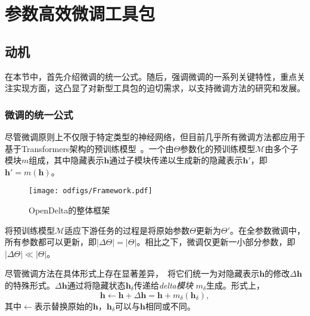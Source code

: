 
\section{参数高效微调工具包}

\subsection{动机}

在本节中，首先介绍微调的统一公式。随后，强调微调的一系列关键特性，重点关注实现方面，这凸显了对新型工具包的迫切需求，以支持微调方法的研究和发展。


\subsubsection{微调的统一公式}

尽管微调原则上不仅限于特定类型的神经网络，但目前几乎所有微调方法都应用于基于Transformers架构的预训练模型~\cite{devlin2018bert, liu2019roberta, raffel2019exploring, brown2020language}。一个由$\Theta$参数化的预训练模型$\mathcal{M}$由多个子模块$m$组成，其中隐藏表示$\mathbf{h}$通过子模块传递以生成新的隐藏表示$\mathbf{h}'$，即$\mathbf{h}' = m(\mathbf{h})$。

\begin{figure*}[!htbp]
    \centering
    \texttt{[image: odfigs/Framework.pdf]}
    \caption{OpenDelta的整体框架}
    \label{fig:framework}
\end{figure*}

将预训练模型$\mathcal{M}$适应下游任务的过程是将原始参数$\Theta$更新为$\Theta'$。在全参数微调中，所有参数都可以更新，即$|\Delta \Theta| = |\Theta|$。相比之下，微调仅更新一小部分参数，即$|\Delta \Theta| \ll |\Theta|$。

尽管微调方法在具体形式上存在显著差异，~\citet{he2022unified}将它们统一为对隐藏表示$\mathbf{h}$的修改$\Delta \mathbf{h}$的特殊形式。$\Delta \mathbf{h}$通过将隐藏状态$\mathbf{h}_{{\delta}}$传递给\textit{delta模块} $m_\delta$生成。形式上，
\begin{equation}
\label{equ:unifydelta}
\mathbf{h} \leftarrow \mathbf{h} + \Delta \mathbf{h} = \mathbf{h} + m_\delta(\mathbf{h}_{{\delta}}),
\end{equation}
其中$\leftarrow$表示替换原始的$\mathbf{h}$，$\mathbf{h}_{{\delta}}$可以与$\mathbf{h}$相同或不同。



